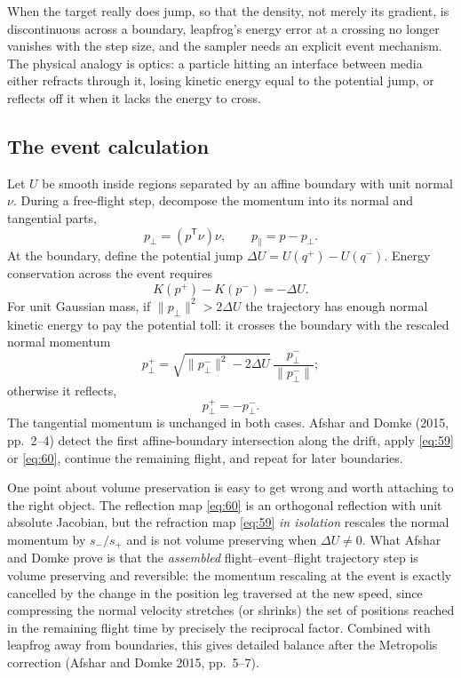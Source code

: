 \documentclass[11pt]{article}
\begin{document}
When the target really does jump, so that the density, not merely its gradient, is
discontinuous across a boundary, leapfrog's energy error at a crossing no
longer vanishes with the step size, and the sampler needs an explicit event
mechanism. The physical analogy is optics: a particle hitting an interface
between media either refracts through it, losing kinetic energy equal to the
potential jump, or reflects off it when it lacks the energy to cross.

\subsection{The event calculation}\label{sec:event-calc}

Let $U$ be smooth inside regions separated by an affine boundary with unit
normal $\nu$. During a free-flight step, decompose the momentum into its
normal and tangential parts,
\begin{equation}\label{eq:57}
 p_\perp=(p^{\mathsf T}\nu)\nu,
 \qquad p_\parallel=p-p_\perp.
\end{equation}
At the boundary, define the potential jump $\Delta U=U(q^+)-U(q^-)$. Energy
conservation across the event requires
\begin{equation}\label{eq:58}
 K(p^+)-K(p^-)=-\Delta U.
\end{equation}
For unit Gaussian mass, if $\|p_\perp\|^2>2\Delta U$ the trajectory has
enough normal kinetic energy to pay the potential toll: it crosses the
boundary with the rescaled normal momentum
\begin{equation}\label{eq:59}
 p_\perp^+=
 \sqrt{\|p_\perp^-\|^2-2\Delta U}\,
 \frac{p_\perp^-}{\|p_\perp^-\|};
\end{equation}
otherwise it reflects,
\begin{equation}\label{eq:60}
 p_\perp^+=-p_\perp^-.
\end{equation}
The tangential momentum is unchanged in both cases. Afshar and Domke (2015,
pp.~2--4) detect the first affine-boundary intersection along the drift,
apply \eqref{eq:59} or \eqref{eq:60}, continue the remaining flight, and
repeat for later boundaries.

One point about volume preservation is easy to get wrong and worth attaching
to the right object. The reflection map \eqref{eq:60} is an orthogonal
reflection with unit absolute Jacobian, but the refraction map \eqref{eq:59}
\emph{in isolation} rescales the normal momentum by $s_-/s_+$ and is not
volume preserving when $\Delta U\neq0$. What Afshar and Domke prove is that
the \emph{assembled} flight--event--flight trajectory step is volume
preserving and reversible: the momentum rescaling at the event is exactly
cancelled by the change in the position leg traversed at the new speed, since
compressing the normal velocity stretches (or shrinks) the set of positions
reached in the remaining flight time by precisely the reciprocal factor.
Combined with leapfrog away from boundaries, this gives detailed balance
after the Metropolis correction (Afshar and Domke 2015, pp.~5--7).
\end{document}
